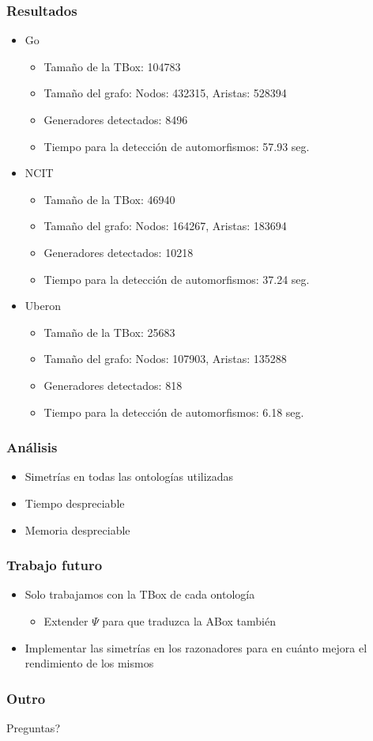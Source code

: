 \documentclass[compress,xcolor=dvipsnames]{beamer}
\theoremstyle{definition}
\begin{document}
\begin{frame}
	\frametitle{Resultados}
	\begin{itemize}[<+->]
	\item Go
		\begin{itemize}[<.->]
		\item Tamaño de la TBox: 104783
		\item Tamaño del grafo: Nodos: 432315, Aristas: 528394
		\item Generadores detectados: 8496
		\item Tiempo para la detección de automorfismos: 57.93 seg.
		\end{itemize}
	\item NCIT
		\begin{itemize}[<.->]
		\item Tamaño de la TBox: 46940
		\item Tamaño del grafo: Nodos: 164267, Aristas: 183694
		\item Generadores detectados: 10218
		\item Tiempo para la detección de automorfismos: 37.24 seg.
		\end{itemize}
	\item Uberon
		\begin{itemize}[<.->]
		\item Tamaño de la TBox: 25683
		\item Tamaño del grafo: Nodos: 107903, Aristas: 135288
		\item Generadores detectados: 818
		\item Tiempo para la detección de automorfismos: 6.18 seg.
		\end{itemize}
	\end{itemize}
\end{frame}

\begin{frame}
	\frametitle{Análisis}
	\begin{itemize}
		\item Simetrías en todas las ontologías utilizadas
		\item Tiempo despreciable
		\item Memoria despreciable
	\end{itemize}
\end{frame}

\begin{frame}
	\frametitle{Trabajo futuro}
	\begin{itemize}
		\item Solo trabajamos con la TBox de cada ontología
			\begin{itemize}
				\item Extender $\Psi$ para que traduzca la ABox también
			\end{itemize}
	\item Implementar las simetrías en los razonadores para en cuánto mejora el rendimiento de los mismos
	\end{itemize}
\end{frame}

\begin{frame}
	\frametitle{Outro}
		\begin{center}
			\large	Preguntas?
		\end{center}
	\end{frame}
\end{document}
